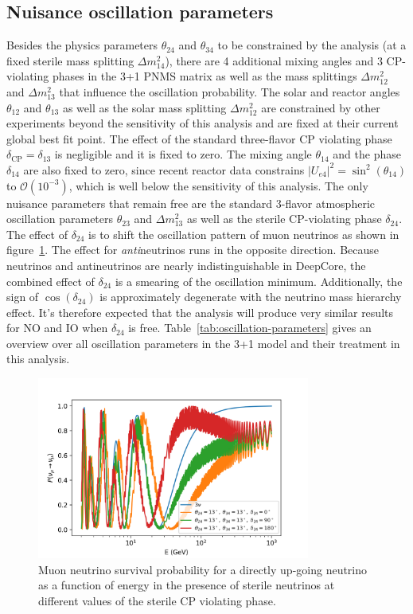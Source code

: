 \subsection{Nuisance oscillation parameters}
Besides the physics parameters $\theta_{24}$ and $\theta_{34}$ to be constrained by the analysis (at a fixed sterile mass splitting $\Delta m^2_{14}$), there are 4 additional mixing angles and 3 CP-violating phases in the 3+1 PNMS matrix as well as the mass splittings $\Delta m^2_{12}$ and $\Delta m^2_{13}$ that influence the oscillation probability. The solar and reactor angles $\theta_{12}$ and $\theta_{13}$ as well as the solar mass splitting $\Delta m^2_{12}$ are constrained by other experiments beyond the sensitivity of this analysis and are fixed at their current global best fit point. The effect of the standard three-flavor CP violating phase $\delta_{\mathrm{CP}}=\delta_{13}$ is negligible and it is fixed to zero. The mixing angle $\theta_{14}$ and the phase $\delta_{14}$ are also fixed to zero, since recent reactor data constrains $|U_{e4}|^2 = \sin^2(\theta_{14})$ to $\mathcal{O}(10^{-3})$, which is well below the sensitivity of this analysis. The only nuisance parameters that remain free are the standard 3-flavor atmospheric oscillation parameters $\theta_{23}$ and $\Delta m^2_{13}$ as well as the sterile CP-violating phase $\delta_{24}$. The effect of $\delta_{24}$ is to shift the oscillation pattern of muon neutrinos as shown in figure~\ref{fig:sterile-cp-phase-effect}. The effect for \emph{anti}neutrinos runs in the opposite direction. Because neutrinos and antineutrinos are nearly indistinguishable in DeepCore, the combined effect of $\delta_{24}$ is a smearing of the oscillation minimum. Additionally, the sign of $\cos(\delta_{24})$ is approximately degenerate with the neutrino mass hierarchy effect. It's therefore expected that the analysis will produce very similar results for NO and IO when $\delta_{24}$ is free. Table~\ref{tab:oscillation-parameters} gives an overview over all oscillation parameters in the 3+1 model and their treatment in this analysis.
\begin{figure}
    \centering
    \includegraphics[width=0.8\textwidth]{figures/measurement/sterile_analysis/physics/Muon_neutrino_survival_probability_with_steriles_1D.png}
    \caption{Muon neutrino survival probability for a directly up-going neutrino as a function of energy in the presence of sterile neutrinos at different values of the sterile CP violating phase.}
    \label{fig:sterile-cp-phase-effect}
\end{figure}

